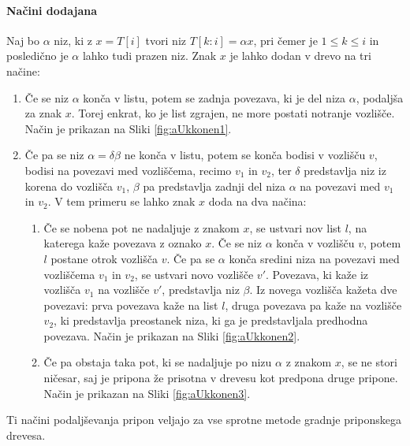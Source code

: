\paragraph{Načini dodajana}\label{par:naciniDodajanja}
Naj bo $\alpha$ niz, ki z $x=T[i]$ tvori niz $T[k:i]=\alpha x$, pri čemer je $1\le k \le i $ in posledično je $\alpha$ lahko tudi prazen niz. Znak $x$ je lahko dodan v drevo na tri načine:
\begin{enumerate}
    \item \label{enum:dodajanje1} Če se niz $\alpha$ konča v listu, potem se zadnja povezava, ki je del niza $\alpha$, podaljša za znak $x$. Torej enkrat, ko je list zgrajen, ne more postati notranje vozlišče. Način je prikazan na Sliki \ref{fig:aUkkonen1}.
    \item Če pa se niz $\alpha=\delta\beta$ ne konča v listu, potem se konča bodisi v vozlišču $v$, bodisi na povezavi med vozliščema, recimo $v_1$ in $v_2$, ter $\delta$ predstavlja niz iz korena do vozlišča $v_1$, $\beta$ pa predstavlja zadnji del niza $\alpha$ na povezavi med $v_1$ in $v_2$. V tem primeru se lahko znak $x$ doda na dva načina:
    \begin{enumerate}
        \item \label{enum:dodajanje2} Če se nobena pot ne nadaljuje z znakom $x$, se ustvari nov list $l$, na katerega kaže povezava z oznako $x$. Če se niz $\alpha$ konča v vozlišču $v$, potem $l$ postane otrok vozlišča $v$. Če pa se $\alpha$ konča sredini niza na povezavi med vozliščema $v_1$ in $v_2$, se ustvari novo vozlišče $v'$. Povezava, ki kaže iz vozlišča $v_1$ na vozlišče $v'$, predstavlja niz $\beta$. Iz novega vozlišča kažeta dve povezavi: prva povezava kaže na list $l$, druga povezava pa kaže na vozlišče $v_2$, ki predstavlja preostanek niza, ki ga je predstavljala predhodna povezava. Način je prikazan na Sliki \ref{fig:aUkkonen2}.
        \item \label{enum:dodajanje3} Če pa obstaja taka pot, ki se nadaljuje po nizu $\alpha$ z znakom $x$, se ne stori ničesar, saj je pripona že prisotna v drevesu kot predpona druge pripone. Način je prikazan na Sliki \ref{fig:aUkkonen3}.
    \end{enumerate}    
\end{enumerate}
Ti načini podaljševanja pripon veljajo za vse sprotne metode gradnje priponskega drevesa.
